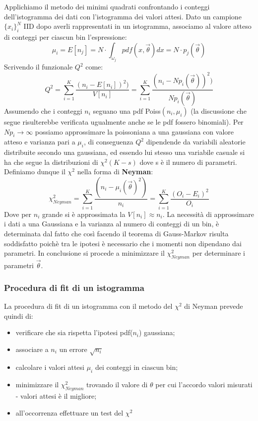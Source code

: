 Applichiamo il metodo dei minimi quadrati confrontando i conteggi dell'istogramma dei dati con l'istogramma dei valori attesi. Dato un campione $\{x_i\}_i^N$ IID dopo averli rappresentati in un istogramma, associamo al valore atteso di conteggi per ciascun bin l'espressione:
\begin{equation*}
	\mu_i = E[n_j] = N \cdot \int_{\omega_j}pdf(x, \vec{\theta})dx = N \cdot p_j(\vec{\theta}) 
\end{equation*}
Scrivendo il funzionale $Q^2$ come:
\begin{equation*}
Q^2 = \sum_{i=1}^K\dfrac{(n_i - E[n_i])^2)}{V[n_i]}	 = \sum_{i=1}^K\dfrac{(n_i - Np_i(\vec{\theta}))^2)}{Np_i(\vec{\theta})} 
\end{equation*}
Assumendo che i conteggi $n_i$ seguano una pdf Poiss$(n_i,\mu_i)$ (la discussione che segue risulterebbe verificata ugualmente anche se le pdf fossero binomiali). Per $Np_i \rightarrow \infty$ possiamo approssimare la poissoniana a una gaussiana con valore atteso e varianza pari a $\mu_i$, di conseguenza $Q^2$ dipendende da variabili aleatorie distribuite secondo una gaussiana, ed essendo lui stesso una variabile casuale si ha che segue la distribuzioni di $\chi^2(K-s)$ dove s \`{e} il numero di parametri. Definiamo dunque il $\chi^2$ nella forma di \textbf{Neyman}:
\begin{equation}
	\chi^2_{Neyman} = \sum_{i=1}^K\dfrac{(n_i - \mu_i(\vec{\theta})^2)}{n_i} = \sum_{i=1}^K\dfrac{(O_i - E_i)^2}{O_i}
\end{equation} 
Dove per $n_i$ grande si \`{e} approssimata la $V[n_i] \approx n_i$. La necessit\`{a} di approssimare i dati a una Gaussiana e la varianza al numero di conteggi di un bin, \`{e} determinata dal fatto che cos\`{i} facendo il teorema di Gauss-Markov risulta soddisfatto poich\`{e} tra le ipotesi \`{e} necessario che i momenti non dipendano dai parametri. In conclusione si procede a minimizzare il $\chi^2_{Neyman}$ per determinare i parametri $\vec{\theta}$.

\subsubsection{Procedura di fit di un istogramma}
La procedura di fit di un istogramma con il metodo del $\chi^2$ di Neyman prevede quindi di:

\begin{itemize}
	\item verificare che sia rispetta l'ipotesi pdf($n_i$) gaussiana;
	\item associare a $n_i$ un errore $\sqrt{n_i}$
	\item calcolare i valori attesi $\mu_i$ dei conteggi in ciascun bin;
	\item minimizzare il $\chi^2_{Neyman}$ trovando il valore di $\theta$ per cui l'accordo valori misurati - valori attesi \`{e} il migliore;
	\item all'occorrenza effettuare un test del $\chi^2$
	\end{itemize}
	
